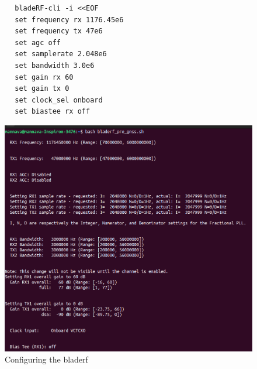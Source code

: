 \begin{enumerate}
\begin{lstlisting}
        bladeRF-cli -i <<EOF
        set frequency rx 1176.45e6
        set frequency tx 47e6
        set agc off
        set samplerate 2.048e6
        set bandwidth 3.0e6
        set gain rx 60
        set gain tx 0
        set clock_sel onboard
        set biastee rx off
    \end{lstlisting}
    \begin{normalsize}
        \begin{figure}[!ht]
            \centering
            \includegraphics[width=1\textwidth]{figs/bladerf_conf.png}
            \centering
            \captionsetup{justification=centering}
            \caption{Configuring the bladerf}
            \end{figure}
        \end{normalsize}


\end{enumerate}
